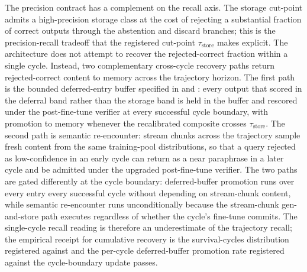 The precision contract has a complement on the recall axis. The storage cut-point admits a high-precision storage class at the cost of rejecting a substantial fraction of correct outputs through the abstention and discard branches; this is the precision-recall tradeoff that the registered cut-point $\tau_{\text{store}}$ makes explicit. The architecture does not attempt to recover the rejected-correct fraction within a single cycle. Instead, two complementary cross-cycle recovery paths return rejected-correct content to memory across the trajectory horizon. The first path is the bounded deferred-entry buffer specified in  and : every output that scored in the deferral band rather than the storage band is held in the buffer and rescored under the post-fine-tune verifier at every successful cycle boundary, with promotion to memory whenever the recalibrated composite crosses $\tau_{\text{store}}$. The second path is semantic re-encounter: stream chunks across the trajectory sample fresh content from the same training-pool distributions, so that a query rejected as low-confidence in an early cycle can return as a near paraphrase in a later cycle and be admitted under the upgraded post-fine-tune verifier. The two paths are gated differently at the cycle boundary: deferred-buffer promotion runs over every entry every successful cycle without depending on stream-chunk content, while semantic re-encounter runs unconditionally because the stream-chunk gen-and-store path executes regardless of whether the cycle's fine-tune commits. The single-cycle recall reading is therefore an underestimate of the trajectory recall; the empirical receipt for cumulative recovery is the survival-cycles distribution registered against  and the per-cycle deferred-buffer promotion rate registered against the cycle-boundary update passes.

